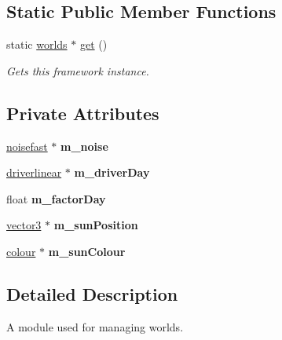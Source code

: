 \subsection*{Static Public Member Functions}
\begin{DoxyCompactItemize}
\item 
static \hyperlink{classflounder_1_1worlds}{worlds} $\ast$ \hyperlink{classflounder_1_1worlds_a4e2369a32659c1ee0dbc62ef481f3a89}{get} ()
\begin{DoxyCompactList}\small\item\em Gets this framework instance. \end{DoxyCompactList}\end{DoxyCompactItemize}
\subsection*{Private Attributes}
\begin{DoxyCompactItemize}
\item 
\mbox{\label{classflounder_1_1worlds_a5764378c8db0f4c72b3f27a70ac6192e}} 
\hyperlink{classnoisefast}{noisefast} $\ast$ {\bfseries m\+\_\+noise}
\item 
\mbox{\label{classflounder_1_1worlds_a0822b6a265ec9d454a98c9a18bb5338d}} 
\hyperlink{classflounder_1_1driverlinear}{driverlinear} $\ast$ {\bfseries m\+\_\+driver\+Day}
\item 
\mbox{\label{classflounder_1_1worlds_a3057d6f45984e6efe80f38c642be342d}} 
float {\bfseries m\+\_\+factor\+Day}
\item 
\mbox{\label{classflounder_1_1worlds_a51250f422619114903796091284a1a64}} 
\hyperlink{classflounder_1_1vector3}{vector3} $\ast$ {\bfseries m\+\_\+sun\+Position}
\item 
\mbox{\label{classflounder_1_1worlds_af67e2b7da4536d55d6fd30bca31bc52f}} 
\hyperlink{classflounder_1_1colour}{colour} $\ast$ {\bfseries m\+\_\+sun\+Colour}
\end{DoxyCompactItemize}


\subsection{Detailed Description}
A module used for managing worlds. 



